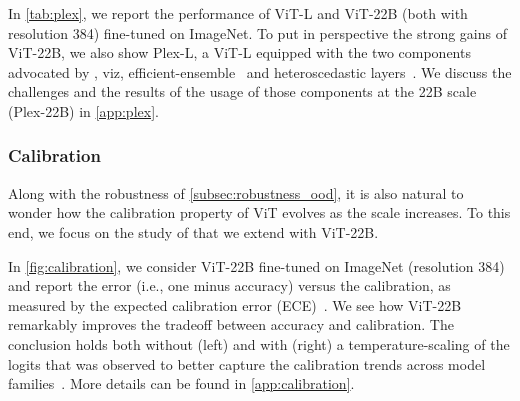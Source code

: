 \documentclass{article}
\newcommand{\chonk}{\mbox{ViT-22B}\xspace}
\begin{document}
In \cref{tab:plex}, we report the performance of ViT-L and ViT-22B (both with resolution 384) fine-tuned on ImageNet. 
To put in perspective the strong gains of ViT-22B, we also show Plex-L, a ViT-L equipped with the two components advocated by \citet{tran2022plex}, viz, efficient-ensemble~\citep{wen2019batchensemble} and heteroscedastic layers~\citep{collier2021correlated}.
We discuss the challenges and the results of the usage of those components at the 22B scale (Plex-22B) in \cref{app:plex}.

\begin{table}[t]
    \caption{ViT-22B evaluated on some representative metrics from the Plex reliability benchmark~\citep{tran2022plex}$^*$.}
\centering
  \setlength{\tabcolsep}{4pt}
    \label{tab:plex}
\end{table}

\subsubsection{Calibration}
\label{subsec:calibration}
Along with the robustness of \cref{subsec:robustness_ood}, it is also natural to wonder how the calibration property of ViT evolves as the scale increases. To this end, we focus on the study of \citet{minderer2021revisiting} that we extend with \chonk.

In \cref{fig:calibration}, we consider \chonk fine-tuned on ImageNet (resolution 384) and report the error (i.e., one minus accuracy) versus the calibration, as measured by the expected calibration error (ECE)~\citep{naeini2015obtaining,guo2017calibration}.
We see how \chonk remarkably improves the tradeoff between accuracy and calibration. The conclusion holds both without (left) and with (right) a temperature-scaling of the logits that was observed to better capture the calibration trends across model families~\citep{minderer2021revisiting}. More details can be found in \cref{app:calibration}.
\end{document}
